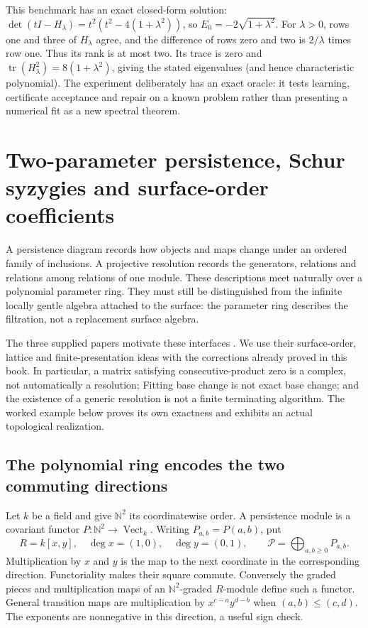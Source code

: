 \documentclass[11pt,oneside,openany]{book}
\theoremstyle{definition}\newtheorem{definition}[theorem]{Definition}
\theoremstyle{remark}\newtheorem{remark}[theorem]{Remark}
\begin{document}
This benchmark has an exact closed-form solution: $\det(tI-H_\lambda)=t^2(t^2-4(1+\lambda^2))$, so $E_0=-2\sqrt{1+\lambda^2}$. For $\lambda>0$, rows one and three of $H_\lambda$ agree, and the difference of rows zero and two is $2/\lambda$ times row one. Thus its rank is at most two. Its trace is zero and $\operatorname{tr}(H_\lambda^2)=8(1+\lambda^2)$, giving the stated eigenvalues (and hence characteristic polynomial). The experiment deliberately has an exact oracle: it tests learning, certificate acceptance and repair on a known problem rather than presenting a numerical fit as a new spectral theorem.

\chapter[Persistence and explicit resolutions]{Two-parameter persistence, Schur syzygies and surface-order coefficients}
\label{pers:chapter}
A persistence diagram records how objects and maps change under an ordered
family of inclusions. A projective resolution records the generators,
relations and relations among relations of one module. These descriptions
meet naturally over a polynomial parameter ring. They must still be
distinguished from the infinite locally gentle algebra attached to the
surface: the parameter ring describes the filtration, not a replacement
surface algebra.

The three supplied papers motivate these interfaces
\cite{PersSurfaceI,PersSurfaceII,PersSurvey}. We use their surface-order,
lattice and finite-presentation ideas with the corrections already proved
in this book. In particular, a matrix satisfying consecutive-product zero
is a complex, not automatically a resolution; Fitting base change is not
exact base change; and the existence of a generic resolution is not a
finite terminating algorithm. The worked example below proves its own
exactness and exhibits an actual topological realization.

\section{The polynomial ring encodes the two commuting directions}
Let $k$ be a field and give $\mathbb N^2$ its coordinatewise order. A
persistence module is a covariant functor $P:\mathbb N^2\to\operatorname{Vect}_k$.
Writing $P_{a,b}=P(a,b)$, put
\[
 R=k[x,y],\quad \deg x=(1,0),\quad\deg y=(0,1),\qquad
 \mathcal P=\bigoplus_{a,b\ge0}P_{a,b}.
\]
Multiplication by $x$ and $y$ is the map to the next coordinate in the
corresponding direction. Functoriality makes their square commute.
Conversely the graded pieces and multiplication maps of an
$\mathbb N^2$-graded $R$-module define such a functor. General transition
maps are multiplication by $x^{c-a}y^{d-b}$ when $(a,b)\le(c,d)$.
The exponents are nonnegative in this direction, a useful sign check.
\end{document}
